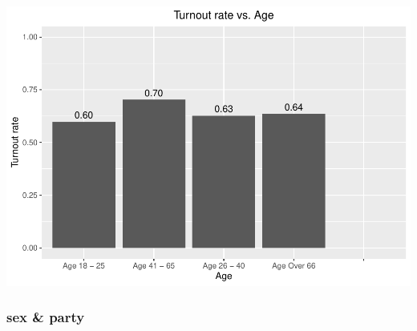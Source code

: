 \documentclass[
]{article}
\begin{document}
\includegraphics{CS2_files/figure-latex/unnamed-chunk-13-1.pdf}

\hypertarget{sex-party}{%
\subsubsection{sex \& party}\label{sex-party}}
\end{document}
